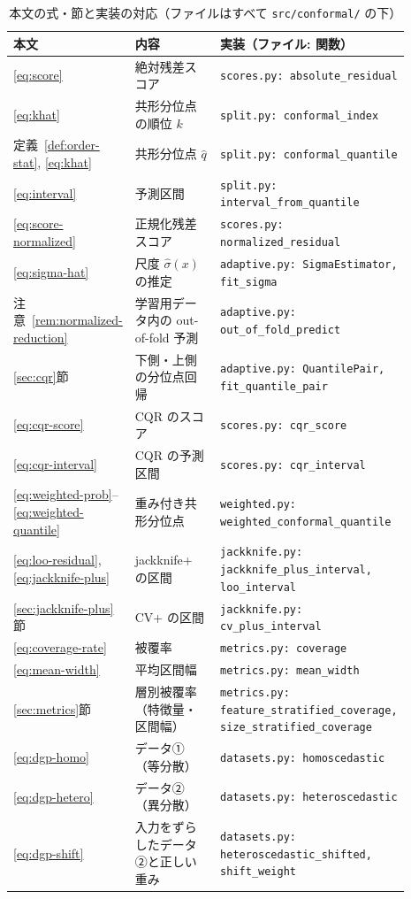\documentclass[a4paper,11pt]{jsarticle}
\theoremstyle{definition}
\theoremstyle{plain}
\theoremstyle{remark}
\newcommand{\qhat}{\hat{q}}
\begin{document}
\begin{table}[htbp]
  \centering
  \small
  \caption{本文の式・節と実装の対応（ファイルはすべて \texttt{src/conformal/} の下）}
  \label{tab:code-map}
  \begin{tabular}{p{0.26\linewidth}p{0.25\linewidth}p{0.38\linewidth}}
    \toprule
    本文 & 内容 & 実装（ファイル: 関数） \\
    \midrule
    \eqref{eq:score} & 絶対残差スコア & \texttt{scores.py: absolute\_residual} \\
    \eqref{eq:khat} & 共形分位点の順位 $k$ & \texttt{split.py: conformal\_index} \\
    定義~\ref{def:order-stat}, \eqref{eq:khat} & 共形分位点 $\qhat$ & \texttt{split.py: conformal\_quantile} \\
    \eqref{eq:interval} & 予測区間 & \texttt{split.py: interval\_from\_quantile} \\
    \eqref{eq:score-normalized} & 正規化残差スコア & \texttt{scores.py: normalized\_residual} \\
    \eqref{eq:sigma-hat} & 尺度 $\hat\sigma(x)$ の推定 & \texttt{adaptive.py: SigmaEstimator, fit\_sigma} \\
    注意~\ref{rem:normalized-reduction} & 学習用データ内の out-of-fold 予測 & \texttt{adaptive.py: out\_of\_fold\_predict} \\
    \ref{sec:cqr}節 & 下側・上側の分位点回帰 & \texttt{adaptive.py: QuantilePair, fit\_quantile\_pair} \\
    \eqref{eq:cqr-score} & CQR のスコア & \texttt{scores.py: cqr\_score} \\
    \eqref{eq:cqr-interval} & CQR の予測区間 & \texttt{scores.py: cqr\_interval} \\
    \eqref{eq:weighted-prob}--\eqref{eq:weighted-quantile} & 重み付き共形分位点 & \texttt{weighted.py: weighted\_conformal\_quantile} \\
    \eqref{eq:loo-residual}, \eqref{eq:jackknife-plus} & jackknife+ の区間 & \texttt{jackknife.py: jackknife\_plus\_interval, loo\_interval} \\
    \ref{sec:jackknife-plus}節 & CV+ の区間 & \texttt{jackknife.py: cv\_plus\_interval} \\
    \eqref{eq:coverage-rate} & 被覆率 & \texttt{metrics.py: coverage} \\
    \eqref{eq:mean-width} & 平均区間幅 & \texttt{metrics.py: mean\_width} \\
    \ref{sec:metrics}節 & 層別被覆率（特徴量・区間幅） & \texttt{metrics.py: feature\_stratified\_coverage, size\_stratified\_coverage} \\
    \eqref{eq:dgp-homo} & データ①（等分散） & \texttt{datasets.py: homoscedastic} \\
    \eqref{eq:dgp-hetero} & データ②（異分散） & \texttt{datasets.py: heteroscedastic} \\
    \eqref{eq:dgp-shift} & 入力をずらしたデータ②と正しい重み & \texttt{datasets.py: heteroscedastic\_shifted, shift\_weight} \\
    \bottomrule
  \end{tabular}
\end{table}
\end{document}
